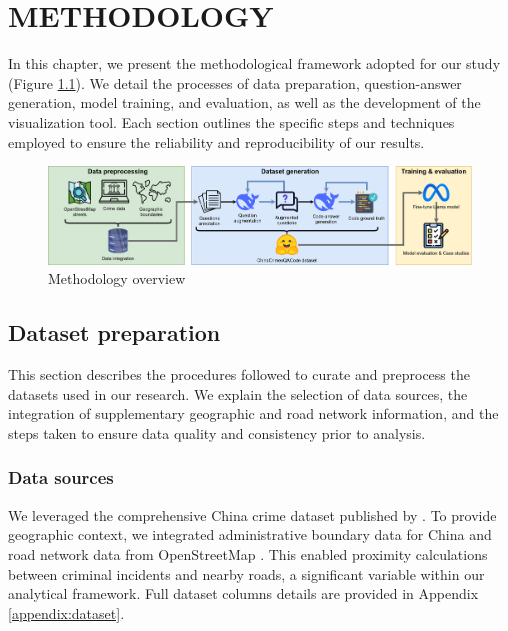 \chapter{ METHODOLOGY}

\noindent
In this chapter, we present the methodological framework adopted for our study (Figure \ref{fig:methodology_overview}). We detail the processes of data preparation, question-answer generation, model training, and evaluation, as well as the development of the visualization tool. Each section outlines the specific steps and techniques employed to ensure the reliability and reproducibility of our results.


\begin{figure}[hbtp]
  \centering
  \includegraphics[width=\textwidth]{images/metodologia.png}
  \caption{Methodology overview}
  \label{fig:methodology_overview}
\end{figure}


\section{Dataset preparation}

\noindent
This section describes the procedures followed to curate and preprocess the datasets used in our research. We explain the selection of data sources, the integration of supplementary geographic and road network information, and the steps taken to ensure data quality and consistency prior to analysis.

\subsection{Data sources}

We leveraged the comprehensive China crime dataset published by \cite{Zhang2025CrimeDatasetChina}. To provide geographic context, we integrated administrative boundary data for China \citep{GeoJSON2025China} and road network data from OpenStreetMap \citep{Vargas2021OSM}. This enabled proximity calculations between criminal incidents and nearby roads, a significant variable within our analytical framework. Full dataset columns details are provided in Appendix \ref{appendix:dataset}.

